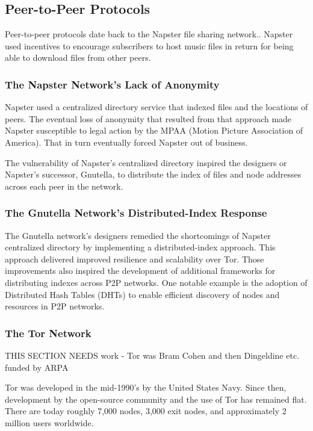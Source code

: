\subsection{Peer-to-Peer Protocols}
Peer-to-peer protocols date back to the Napster file sharing network.\cite{42}. Napster used incentives to encourage subscribers to host music files in return for being able to download files from other peers.

\subsubsection{The Napster Network's Lack of Anonymity}
Napster used a centralized directory service that indexed files and the locations of peers. The eventual loss of anonymity that resulted from that approach made Napster susceptible to legal action by the MPAA (Motion Picture Association of America). That in turn eventually forced Napster out of business.

The vulnerability of Napster's centralized directory inspired the designers or Napster's successor, Gnutella, to  distribute the index of files and node addresses across each peer in the network\cite{43}.

\subsubsection{The Gnutella Network's Distributed-Index Response}
The Gnutella network's designers remedied the shortcomings of Napster centralized directory by implementing a distributed-index approach. This approach delivered improved resilience and scalability over Tor. Those improvements also inspired the development of additional frameworks for distributing indexes across P2P networks. One notable example is the adoption of Distributed Hash Tables (DHTs) to enable efficient discovery of nodes and resources in P2P networks.

\subsubsection{The Tor Network}
\label{subsec: tornetwork}

THIS SECTION NEEDS work - Tor was Bram Cohen and then Dingeldine etc. funded by ARPA\cite{86}

Tor was developed in the mid-1990’s by the United States Navy. Since then, development by the open-source community and the use of Tor has remained flat. There are today roughly 7,000 nodes, 3,000 exit nodes, and approximately 2 million users worldwide.

